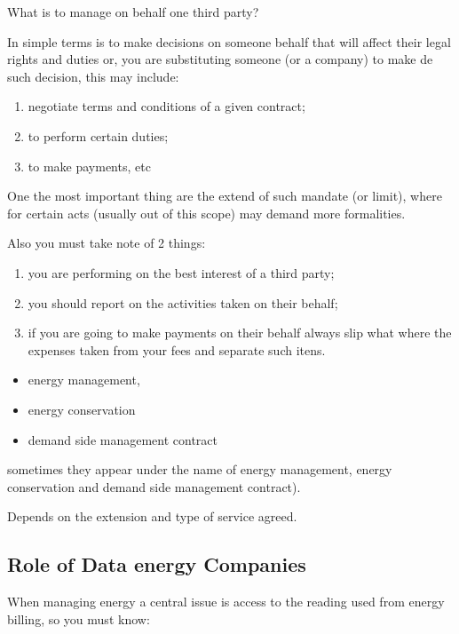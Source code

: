 \documentclass[]{book}
\theoremstyle{definition}
\theoremstyle{definition}
\theoremstyle{definition}
\theoremstyle{remark}
\begin{document}
What is to manage on behalf one third party?

In simple terms is to make decisions on someone behalf that will affect
their legal rights and duties or, you are substituting someone (or a
company) to make de such decision, this may include:

\begin{enumerate}
\def\labelenumi{\Alph{enumi})}
\item
  negotiate terms and conditions of a given contract;
\item
  to perform certain duties;
\item
  to make payments, etc
\end{enumerate}

One the most important thing are the extend of such mandate (or limit),
where for certain acts (usually out of this scope) may demand more
formalities.

Also you must take note of 2 things:

\begin{enumerate}
\def\labelenumi{\Alph{enumi})}
\item
  you are performing on the best interest of a third party;
\item
  you should report on the activities taken on their behalf;
\item
  if you are going to make payments on their behalf always slip what
  where the expenses taken from your fees and separate such itens.
\end{enumerate}

\begin{itemize}
\item
  energy management,
\item
  energy conservation
\item
  demand side management contract
\end{itemize}

sometimes they appear under the name of energy management, energy
conservation and demand side management contract).

Depends on the extension and type of service agreed.

\subsection{Role of Data energy
Companies}\label{role-of-data-energy-companies}

When managing energy a central issue is access to the reading used from
energy billing, so you must know:
\end{document}
